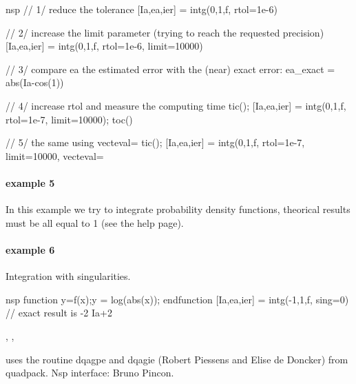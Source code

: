 \begin{examples}
\begin{mintednsp}{nsp}
// 1/ reduce the tolerance
[Ia,ea,ier] = intg(0,1,f, rtol=1e-6)

// 2/ increase the limit parameter (trying to reach the requested precision)
[Ia,ea,ier] = intg(0,1,f, rtol=1e-6, limit=10000)

// 3/ compare ea the estimated error with the (near) exact error:
ea_exact = abs(Ia-cos(1))

// 4/ increase rtol and measure the computing time
tic(); [Ia,ea,ier] = intg(0,1,f, rtol=1e-7, limit=10000); toc()

// 5/ the same using vecteval=%
tic(); [Ia,ea,ier] = intg(0,1,f, rtol=1e-7, limit=10000, vecteval=%
\end{mintednsp}

  
\paragraph{example 5} In this example we try to integrate probability 
density functions, theorical results must be all equal to 1 (see the
 help page). 
  
\paragraph{example 6} Integration with singularities.
\begin{mintednsp}{nsp}
function y=f(x);y = log(abs(x)); endfunction
[Ia,ea,ier] = intg(-1,1,f, sing=0) // exact result is -2
Ia+2
\end{mintednsp}


\end{examples}

\begin{manseealso}
  , ,    
\end{manseealso}

\begin{authors}
  uses the routine dqagpe and dqagie (Robert Piessens and Elise de Doncker) from
  quadpack. Nsp interface: Bruno Pincon.
\end{authors}
